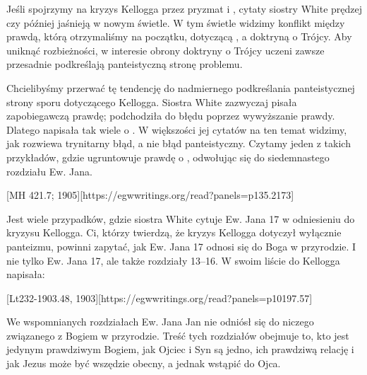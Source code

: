 
Jeśli spojrzymy na kryzys Kellogga przez pryzmat  i , cytaty siostry White prędzej czy później jaśnieją w nowym świetle. W tym świetle widzimy konflikt między prawdą, którą otrzymaliśmy na początku, dotyczącą , a doktryną o Trójcy. Aby uniknąć rozbieżności, w interesie obrony doktryny o Trójcy uczeni zawsze przesadnie podkreślają panteistyczną stronę problemu.

Chcielibyśmy przerwać tę tendencję do nadmiernego podkreślania panteistycznej strony sporu dotyczącego Kellogga. Siostra White zazwyczaj pisała zapobiegawczą prawdę; podchodziła do błędu poprzez wywyższanie prawdy. Dlatego napisała tak wiele o . W większości jej cytatów na ten temat widzimy, jak rozwiewa trynitarny błąd, a nie błąd panteistyczny. Czytamy jeden z takich przykładów, gdzie ugruntowuje prawdę o , odwołując się do siedemnastego rozdziału Ew. Jana.

[MH 421.7; 1905][https://egwwritings.org/read?panels=p135.2173]

Jest wiele przypadków, gdzie siostra White cytuje Ew. Jana 17 w odniesieniu do kryzysu Kellogga. Ci, którzy twierdzą, że kryzys Kellogga dotyczył wyłącznie panteizmu, powinni zapytać, jak Ew. Jana 17 odnosi się do Boga w przyrodzie. I nie tylko Ew. Jana 17, ale także rozdziały 13--16. W swoim liście do Kellogga napisała:

[Lt232-1903.48, 1903][https://egwwritings.org/read?panels=p10197.57]

We wspomnianych rozdziałach Ew. Jana Jan nie odniósł się do niczego związanego z Bogiem w przyrodzie. Treść tych rozdziałów obejmuje to, kto jest jedynym prawdziwym Bogiem, jak Ojciec i Syn są jedno, ich prawdziwą relację i jak Jezus może być wszędzie obecny, a jednak wstąpić do Ojca.

